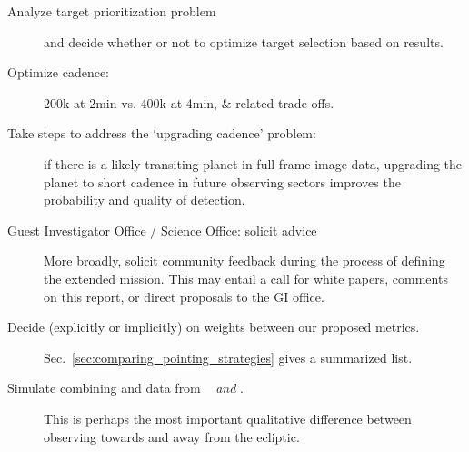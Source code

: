 \begin{description}
	\item[Analyze target prioritization problem] and decide whether or not to optimize target selection based on results. %
	
	\item[Optimize cadence:] 200k at 2min vs. 400k at 4min, \& related trade-offs.
	
	\item[Take steps to address the `upgrading cadence' problem:] 
	if there is a likely transiting planet in full frame image data, upgrading the planet to short cadence in future observing sectors improves the probability and quality of detection.
	
	\item[Guest Investigator Office / \tess Science Office: solicit advice]
	More broadly, solicit community feedback during the process of defining the extended mission.
	This may entail a call for white papers, comments on this report, or direct proposals to the GI office. 
	
	\item[Decide (explicitly or implicitly) on weights between our proposed metrics.]
	Sec.~\ref{sec:comparing_pointing_strategies} gives a summarized list.
	
	\item[Simulate combining \tess and \ktwo data from \rm{\elong\ } \textit{and} \rm{\eshort}.] 
	This is perhaps the most important qualitative difference between observing towards and away from the ecliptic.
	

\end{description}

